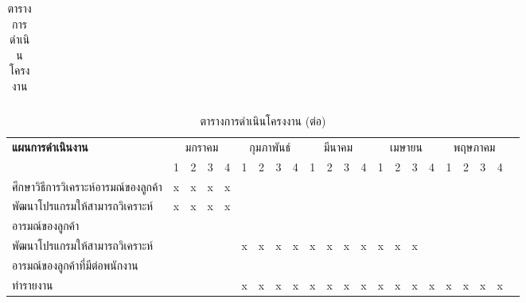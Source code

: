\begin{landscape}
\begin{table}[h!]
\begin{tabular}{|l|c|c|c|c|c|c|c|c|c|c|c|c|c|c|c|c|c|c|c|c|}
  \end{tabular}
  \caption{ตารางการดำเนินโครงงาน}
  \label{fig:table}
\hrulefill
\end{table}
\begin{table}[h!]
 \centering
  \begin{tabular}{|l|c|c|c|c|c|c|c|c|c|c|c|c|c|c|c|c|c|c|c|c|c|}
  
    \hline
    \multirow{2}{*}{\textbf{แผนการดำเนินงาน}}
    & \multicolumn{4}{c|}{มกราคม} 
    & \multicolumn{4}{c|}{กุมภาพันธ์} 
    & \multicolumn{4}{c|}{มีนาคม}
    & \multicolumn{4}{c|}{เมษายน}
    & \multicolumn{4}{c|}{พฤษภาคม}\\
    \cline{2-21}
    & 1 & 2 & 3 & 4
    & 1 & 2 & 3 & 4
    & 1 & 2 & 3 & 4
    & 1 & 2 & 3 & 4
    & 1 & 2 & 3 & 4\\
	 \hline
    ศึกษาวิธีการวิเคราะห์อารมณ์ของลูกค้า  &x&x&x&x&&&&&&&&&&&&&&&&\\
    \hline
    พัฒนาโปรแกรมให้สามารถวิเคราะห์ &x&x&x&x&&&&&&&&&&&&&&&&\\
	อารมณ์ของลูกค้า &&&&&&&&&&&&&&&&&&&&\\
	\hline
    พัฒนาโปรแกรมให้สามารถวิเคราะห์ &&&&&x&x&x&x&x&x&x&x&x&x&x&&&&&\\
	อารมณ์ของลูกค้าที่มีต่อพนักงาน  &&&&&&&&&&&&&&&&&&&&\\
    \hline
    ทำรายงาน &&&&&x&x&x&x&x&x&x&x&x&x&x&x&x&x&x&x\\
    \hline
   
  \end{tabular}
  \caption{ตารางการดำเนินโครงงาน (ต่อ)}
  \label{fig:table2}
  \hrulefill
\end{table}
\end{landscape} 
